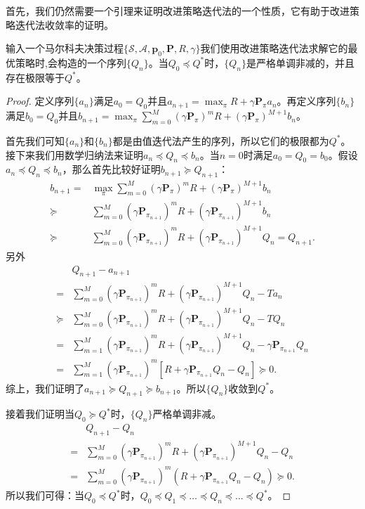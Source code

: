首先，我们仍然需要一个引理来证明改进策略迭代法的一个性质，它有助于改进策略迭代法收敛率的证明。
\begin{lemma}
    输入一个马尔科夫决策过程$\{\mathcal{S}, \mathcal{A}, \mathbf{p}_0, \mathbf{P}, R, \gamma\}$我们使用改进策略迭代法求解它的最优策略时,会构造的一个序列$\{Q_n\}$。当$Q_0 \preceq Q^*$时，$\{Q_n\}$是严格单调非减的，并且存在极限等于$Q^*$。
\end{lemma}
\begin{proof}
    定义序列$\{a_n\}$满足$a_0 = Q_0$并且$a_{n+1} = \max_{\pi} R + \gamma \mathbf{P}_{\pi}a_n$。再定义序列$\{b_n\}$满足$b_0 = Q_0$并且$b_{n+1} = \max_\pi \sum^M_{m=0}(\gamma\mathbf{P}_\pi)^mR + (\gamma \mathbf{P}_{\pi})^{M+1}b_n$。

    首先我们可知$\{a_n\}$和$\{b_n\}$都是由值迭代法产生的序列，所以它们的极限都为$Q^*$。接下来我们用数学归纳法来证明$a_n \preceq Q_n \preceq b_n$。当$n=0$时满足$a_0 = Q_0 = b_0$。假设$a_n \preceq Q_n \preceq b_n$，那么首先比较好证明$b_{n+1} \succeq Q_{n+1}$：
    \begin{align*}
        b_{n+1} =& \max_\pi \sum^M_{m=0}(\gamma\mathbf{P}_\pi)^mR + (\gamma 
        \mathbf{P}_{\pi})^{M+1}b_n\\
        \succeq& \sum^M_{m=0}(\gamma\mathbf{P}_{\pi_{n+1}})^mR + (\gamma 
        \mathbf{P}_{\pi_{n+1}})^{M+1}b_n\\
        \succeq& \sum^M_{m=0}(\gamma\mathbf{P}_{\pi_{n+1}})^mR + (\gamma 
        \mathbf{P}_{\pi_{n+1}})^{M+1}Q_n = Q_{n+1}.
    \end{align*}
    另外
    \begin{align*}
        &Q_{n+1} - a_{n+1}\\
        =& \sum^M_{m=0}(\gamma\mathbf{P}_{\pi_{n+1}})^m R
        + (\gamma \mathbf{P}_{\pi_{n+1}})^{M+1} Q_n - Ta_n\\
        \succeq& \sum^M_{m=0}(\gamma\mathbf{P}_{\pi_{n+1}})^m R
        + (\gamma \mathbf{P}_{\pi_{n+1}})^{M+1} Q_n - TQ_n\\
        =& \sum^M_{m=1}(\gamma\mathbf{P}_{\pi_{n+1}})^m R
        + (\gamma \mathbf{P}_{\pi_{n+1}})^{M+1} Q_n 
        - \gamma \mathbf{P}_{\pi_{n+1}} Q_n\\
        =& \sum^{M}_{m=1}(\gamma\mathbf{P}_{\pi_{n+1}})^m
        [R + \gamma\mathbf{P}_{\pi_{n+1}}Q_n - Q_n] \succeq 0.
    \end{align*}
    综上，我们证明了$a_{n+1} \succeq Q_{n+1} \succeq b_{n+1}$。所以$\{Q_n\}$收敛到$Q^*$。

    接着我们证明当$Q_0\succeq Q^*$时，$\{Q_n\}$严格单调非减。
    \begin{align*}
        &Q_{n+1} - Q_{n}\\
        =& \sum^{M}_{m=0} (\gamma \mathbf{P}_{\pi_{n+1}})^m R 
        + (\gamma \mathbf{P}_{\pi_{n+1}})^{M+1}Q_{n} - Q_{n}\\
        =& \sum^{M}_{m=0} (\gamma \mathbf{P}_{\pi_{n+1}})^m
        (R + \gamma \mathbf{P}_{\pi_{n+1}} Q_n - Q_n) \succeq 0.
    \end{align*}
    所以我们可得：当$Q_0\preceq Q^*$时，$Q_0 \preceq Q_1 \preceq \ldots \preceq Q_n
    \preceq \ldots \preceq Q^*$。
\end{proof}

